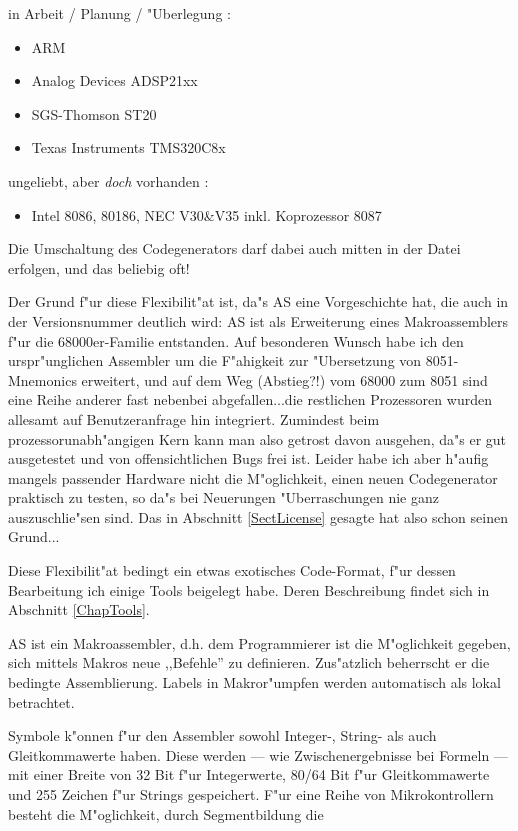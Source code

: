 \documentclass[12pt,a4paper,twoside]{report}
\begin{document}
in Arbeit / Planung / "Uberlegung :
\begin{itemize}
\item{ARM}
\item{Analog Devices ADSP21xx}
\item{SGS-Thomson ST20}
\item{Texas Instruments TMS320C8x}
\end{itemize}
ungeliebt, aber {\it doch} vorhanden :
\begin{itemize}
\item{Intel 8086, 80186, NEC V30\&V35 inkl. Koprozessor 8087}
\end{itemize}
Die Umschaltung des Codegenerators darf dabei auch mitten in der Datei
erfolgen, und das beliebig oft!
\par
Der Grund f"ur diese Flexibilit"at ist, da"s AS eine Vorgeschichte hat,
die auch in der Versionsnummer deutlich wird: AS ist als Erweiterung eines
Makroassemblers f"ur die 68000er-Familie entstanden.  Auf besonderen
Wunsch habe ich den urspr"unglichen Assembler um die F"ahigkeit zur
"Ubersetzung von 8051-Mnemonics erweitert, und auf dem Weg (Abstieg?!) vom
68000 zum 8051 sind eine Reihe anderer fast nebenbei abgefallen...die
restlichen Prozessoren wurden allesamt auf Benutzeranfrage hin integriert.
Zumindest beim prozessorunabh"angigen Kern kann man also getrost davon
ausgehen, da"s er gut ausgetestet und von offensichtlichen Bugs frei ist.
Leider habe ich aber h"aufig mangels passender Hardware nicht die
M"oglichkeit, einen neuen Codegenerator praktisch zu testen, so da"s bei
Neuerungen "Uberraschungen nie ganz auszuschlie"sen sind.  Das in
Abschnitt \ref{SectLicense} gesagte hat also schon seinen Grund...
\par
Diese Flexibilit"at bedingt ein etwas exotisches Code-Format, f"ur dessen
Bearbeitung ich einige Tools beigelegt habe.  Deren Beschreibung findet
sich in Abschnitt \ref{ChapTools}.
\par
AS ist ein Makroassembler, d.h. dem Programmierer ist die M"oglichkeit
gegeben, sich mittels Makros neue ,,Befehle'' zu definieren.  Zus"atzlich
beherrscht er die bedingte Assemblierung.  Labels in Makror"umpfen werden
automatisch als lokal betrachtet.
\par
Symbole k"onnen f"ur den Assembler sowohl Integer-, String- als auch
Gleitkommawerte haben.  Diese werden --- wie Zwischenergebnisse bei Formeln
--- mit einer Breite von 32 Bit f"ur Integerwerte, 80/64 Bit f"ur
Gleitkommawerte und 255 Zeichen f"ur Strings gespeichert.  F"ur eine Reihe
von Mikrokontrollern besteht die M"oglichkeit, durch Segmentbildung die
\end{document}
